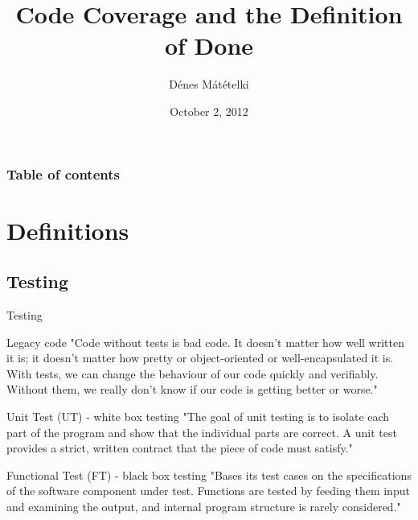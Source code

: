 \documentclass{beamer}
\title {Code Coverage and the Definition of Done}
\author{Dénes Mátételki}
\institute{www.emerson.com}
\date{October 2, 2012}
\begin{document}

\begin{frame}
\titlepage
\end{frame}


\begin{frame}
\frametitle{Table of contents}
\tableofcontents
\end{frame}


\section{Definitions}

\subsection{Testing}


\begin{frame}{Testing}

\begin{block}{Legacy code}
\small
"Code without tests is bad code. It doesn't matter how well written it is; it doesn't matter how pretty or object-oriented or well-encapsulated it is. With tests, we can change the behaviour of our code quickly and verifiably. Without them, we really don't know if our code is getting better or worse." \cite{legacy}
\end{block}

\begin{block}{Unit Test (UT) - white box testing}
\small
"The goal of unit testing is to isolate each part of the program and show that the individual parts are correct. A unit test provides a strict, written contract that the piece of code must satisfy." \cite{ut}
\end{block}

\begin{block}{Functional Test (FT) - black box testing}
\small
"Bases its test cases on the specifications of the software component under test. Functions are tested by feeding them input and examining the output, and internal program structure is rarely considered." \cite{ft}
\end{block}

\end{frame}
\end{document}
